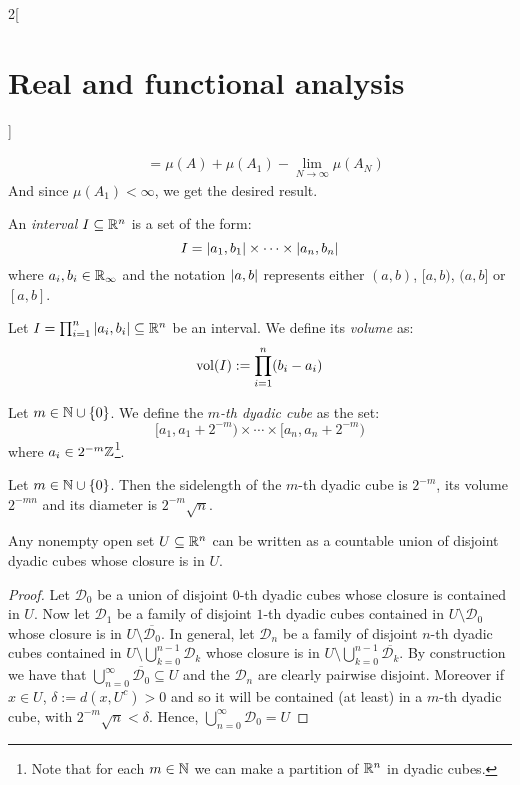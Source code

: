 \documentclass[../../../main_math.tex]{subfiles}
\begin{document}
\begin{multicols}{2}[\section{Real and functional analysis}]
\begin{sproof}
\begin{enumerate}
\begin{align*}
                       & =\mu(A)+\mu(A_1)-\lim_{N\to\infty}\mu(A_N)
            \end{align*}
            And since $\mu(A_1)<\infty$, we get the desired result.
    \end{enumerate}
  \end{sproof}
  \begin{definition}
    An \emph{interval} $I\subseteq\mathbb{R}^n$ is a set of the form:
    $$I=\abs{a_1,b_1}\times\cdots\times\abs{a_n,b_n}$$
    where $a_i,b_i\in\mathbb{R}_\infty$ and the notation $\abs{a,b}$ represents either $(a,b)$, $[a,b)$, $(a,b]$ or $[a,b]$.
  \end{definition}
  \begin{definition}
    Let $I=\prod_{i=1}^n\abs{a_i,b_i}\subseteq\mathbb{R}^n$ be an interval. We define its \emph{volume} as:
    $$\operatorname{vol}(I):=\prod_{i=1}^n(b_i-a_i)$$
  \end{definition}
  \begin{definition}
    Let $m\in\mathbb{N}\cup\{0\}$. We define the \emph{$m$-th dyadic cube} as the set: $$[a_1,a_1+2^{-m})\times\cdots\times [a_n,a_n+2^{-m})$$
    where $a_i\in 2^{-m}\mathbb{Z}$\footnote{Note that for each $m\in\mathbb{N}$ we can make a partition of $\mathbb{R}^n$ in dyadic cubes.}.
  \end{definition}
  \begin{lemma}
    Let $m\in\mathbb{N}\cup\{0\}$. Then the sidelength of the $m$-th dyadic cube is $2^{-m}$, its volume $2^{-mn}$ and its diameter is $2^{-m}\sqrt{n}$.
  \end{lemma}
  \begin{proposition}
    Any nonempty open set $U\subseteq\mathbb{R}^n$ can be written as a countable union of disjoint dyadic cubes whose closure is in $U$.
  \end{proposition}
  \begin{proof}
    Let $\mathcal{D}_0$ be a union of disjoint $0$-th dyadic cubes whose closure is contained in $U$. Now let $\mathcal{D}_1$ be a family of disjoint $1$-th dyadic cubes contained in $U\setminus\mathcal{D}_0$ whose closure is in $U\setminus\overline{\mathcal{D}_0}$. In general, let $\mathcal{D}_n$ be a family of disjoint $n$-th dyadic cubes contained in $U\setminus\bigcup_{k=0}^{n-1}\mathcal{D}_k$ whose closure is in $U\setminus\bigcup_{k=0}^{n-1}\overline{\mathcal{D}_k}$. By construction we have that $\bigcup_{n=0}^\infty \overline{\mathcal{D}_0}\subseteq U$ and the $\mathcal{D}_n$ are clearly pairwise disjoint. Moreover if $x\in U$, $\delta:=d(x,U^c)>0$ and so it will be contained (at least) in a $m$-th dyadic cube, with $2^{-m}\sqrt{n}<\delta$. Hence, $\bigcup_{n=0}^\infty \mathcal{D}_0=U$

\end{proof}
\end{multicols}
\end{document}
